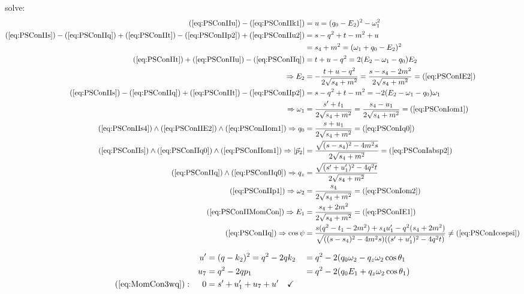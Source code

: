 solve:
\begin{align}
(\ref{eq:PSConIIu})-(\ref{eq:PSConIIk1}) &= u=(q_0-E_2)^2-\omega_1^2 \label{eq:PSConIIu2}\\
(\ref{eq:PSConIIs}) - (\ref{eq:PSConIIq}) + (\ref{eq:PSConIIt}) - (\ref{eq:PSConIIp2}) + (\ref{eq:PSConIIu2}) &= s-q^2+t-m^2+u\\
 &= s_4+m^2 = (\omega_1+q_0-E_2)^2 \label{eq:PSConIIs4}\\
(\ref{eq:PSConIIt}) + (\ref{eq:PSConIIu}) - (\ref{eq:PSConIIq}) &= t+u-q^2 = 2(E_2-\omega_1-q_0)E_2\\
\Rightarrow E_2 &= -\frac{t+u-q^2}{2\sqrt{s_4+m^2}} =\frac{s-s_4-2m^2}{2\sqrt{s_4+m^2}} = (\ref{eq:PSConIE2}) \label{eq:PSConIIE2}\\
(\ref{eq:PSConIIs}) - (\ref{eq:PSConIIq}) + (\ref{eq:PSConIIt}) - (\ref{eq:PSConIIp2}) &= s-q^2+t-m^2 = -2(E_2-\omega_1-q_0)\omega_1\\
\Rightarrow \omega_1 &= \frac{s'+t_1}{2\sqrt{s_4+m^2}} =\frac{s_4-u_1}{2\sqrt{s_4+m^2}} = (\ref{eq:PSConIom1}) \label{eq:PSConIIom1}\\
(\ref{eq:PSConIIs4}) \land (\ref{eq:PSConIIE2}) \land (\ref{eq:PSConIIom1}) \Rightarrow q_0 &= \frac{s+u_1}{2\sqrt{s_4+m^2}} = (\ref{eq:PSConIq0}) \label{eq:PSConIIq0}\\
(\ref{eq:PSConIIs}) \land (\ref{eq:PSConIIq0}) \land (\ref{eq:PSConIIom1}) \Rightarrow \left|\vec p_2\right| &= \frac{\sqrt{(s-s_4)^2-4m^2 s}}{2\sqrt{s_4+m^2}} = (\ref{eq:PSConIabsp2}) \label{eq:PSConIIabsp2}\\
(\ref{eq:PSConIIq}) \land (\ref{eq:PSConIIq0}) \Rightarrow q_z &= \frac{\sqrt{(s'+u_1')^2-4q^2t}}{2\sqrt{s_4+m^2}} \label{eq:PSConIIqz}\\
(\ref{eq:PSConIIp1}) \Rightarrow \omega_2 &= \frac{s_4}{2\sqrt{s_4+m^2}} = (\ref{eq:PSConIom2}) \label{eq:PSConIIom2}\\
(\ref{eq:PSConIIMomCon}) \Rightarrow E_1 &= \frac{s_4+2m^2}{2\sqrt{s_4+m^2}} = (\ref{eq:PSConIE1}) \label{eq:PSConIIE1}\\
(\ref{eq:PSConIIq}) \Rightarrow \cos\psi &= \frac{s(q^2-t_1-2m^2)+s_4 u_1' - q^2(s_4+2m^2)}{\sqrt{((s-s_4)^2-4m^2s)((s'+u_1')^2-4q^2 t)}} \neq (\ref{eq:PSConIcospsi}) \label{eq:PSConIIcospsi}
\end{align}

\begin{align}
&&u' &=(q-k_2)^2 = q^2-2qk_2 &&= q^2-2(q_0\omega_2 -q_z\omega_2\cos\theta_1\\
&&u_7 &= q^2-2qp_1 &&=q^2 - 2(q_0E_1 +q_z\omega_2\cos\theta_1)\\
(\ref{eq:MomCon3wq}): &&0 &=s'+u_1'+u_7+u'\quad\checkmark
\end{align}

